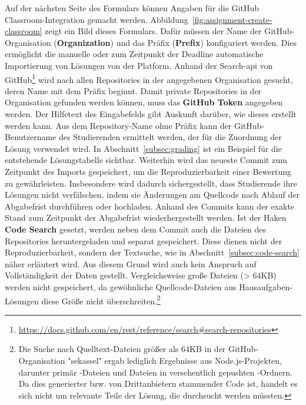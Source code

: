 Auf der nächsten Seite des Formulars können Angaben für die GitHub Classroom-Integration gemacht werden.
Abbildung~\ref{fig:assignment-create-classroom} zeigt ein Bild dieses Formulars.
Dafür müssen der Name der GitHub-Organisation (\textbf{Organization}) und das Präfix (\textbf{Prefix}) konfiguriert werden.
Dies ermöglicht die manuelle oder zum Zeitpunkt der Deadline automatische Importierung von Lösungen von der Platform.
Anhand der Search-\ac{api} von GitHub\footnote{\url{https://docs.github.com/en/rest/reference/search\#search-repositories}} wird nach allen Repositories in der angegebenen Organisation gesucht, deren Name mit dem Präfix beginnt.
Damit private Repositories in der Organisation gefunden werden können, muss das \textbf{GitHub Token} angegeben werden.
Der Hilfetext des Eingabefelds gibt Auskunft darüber, wie dieses erstellt werden kann.
Aus dem Repository-Name ohne Präfix kann der GitHub-Benutzername des Studierenden ermittelt werden, der für die Zuordnung der Lösung verwendet wird.
In Abschnitt~\ref{subsec:grading} ist ein Beispiel für die entstehende Lösungstabelle sichtbar.
Weiterhin wird das neueste Commit zum Zeitpunkt des Imports gespeichert, um die Reproduzierbarkeit einer Bewertung zu gewährleisten.
Insbesondere wird dadurch sichergestellt, dass Studierende ihre Lösungen nicht verfälschen, indem sie Änderungen am Quellcode nach Ablauf der Abgabefrist durchführen oder hochladen.
Anhand des Commits kann der exakte Stand zum Zeitpunkt der Abgabefrist wiederhergestellt werden.
Ist der Haken \textbf{Code Search} gesetzt, werden neben dem Commit auch die Dateien des Repositories heruntergeladen und separat gespeichert.
Diese dienen nicht der Reproduzierbarkeit, sondern der Textsuche, wie in Abschnitt~\ref{subsec:code-search} näher erläutert wird.
Aus diesem Grund wird auch kein Anspruch auf Vollständigkeit der Daten gestellt.
Vergleichsweise große Dateien (> 64KB) werden nicht gespeichert, da gewöhnliche Quellcode-Dateien aus Hausaufgaben-Lösungen diese Größe nicht überschreiten.\footnote{
    Die Suche nach Quelltext-Dateien größer als 64KB in der GitHub-Organisation "sekassel" ergab lediglich Ergebnisse aus Node.js-Projekten, darunter primär -Dateien und Dateien in versehentlich gepushten -Ordnern.
    Da dies generierter bzw. von Drittanbietern stammender Code ist, handelt es sich nicht um relevante Teile der Lösung, die durchsucht werden müssten.
}

